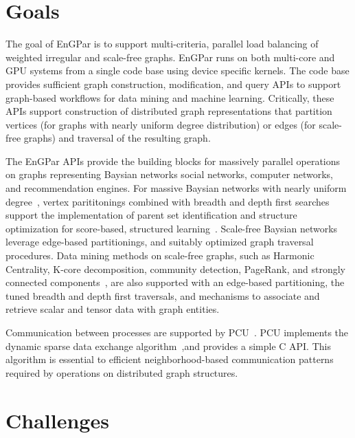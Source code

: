 \documentclass{article}
\begin{document}
\section{Goals}

The goal of EnGPar is to support multi-criteria, parallel load balancing of
weighted irregular and scale-free graphs.
EnGPar runs on both multi-core and GPU systems from a single code base using
device specific kernels.
The code base provides sufficient graph construction, modification, and query
APIs to support graph-based workflows for data mining and machine learning.
Critically, these APIs support construction of distributed graph representations
that partition vertices (for graphs with nearly uniform degree distribution) or
edges (for scale-free graphs) and traversal of the resulting graph.

The EnGPar APIs provide the building blocks for massively parallel operations on
graphs representing Baysian networks social networks, computer networks, and
recommendation engines.
For massive Baysian networks with nearly uniform degree~\cite{Andreassen1989},
vertex parititonings combined with breadth and depth first searches support the
implementation of parent set identification and structure optimization for
score-based, structured learning~\cite{Scanagatta2015}.
Scale-free Baysian networks~\cite{Andreassen1989} leverage edge-based
partitionings, and suitably optimized graph traversal procedures.
Data mining methods on scale-free graphs, such as Harmonic Centrality, K-core
decomposition, community detection, PageRank, and strongly connected
components~\cite{slota_ipdps2016,slota_ipdps2017}, are also supported with an
edge-based partitioning, the tuned breadth and depth first traversals, and
mechanisms to associate and retrieve scalar and tensor data with graph entities.

Communication between processes are supported by PCU~\cite{ibanez2016pumi}.
PCU implements the dynamic sparse data exchange
algorithm~\cite{hoefler2010scalable},and provides a simple C API.
This algorithm is essential to efficient neighborhood-based communication patterns
required by operations on distributed graph structures.

\section{Challenges}
\end{document}
